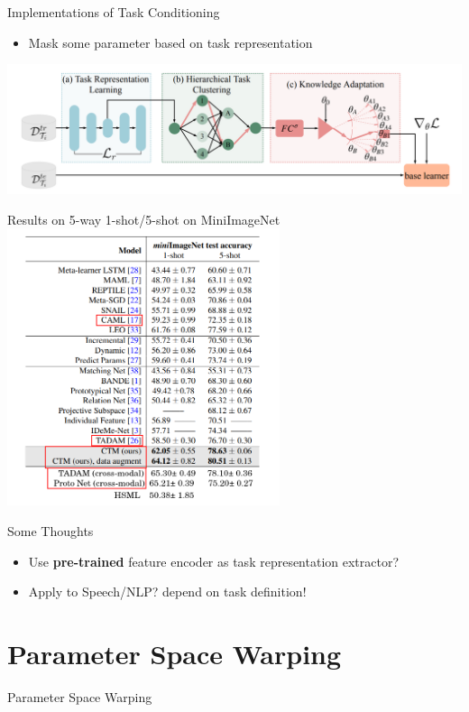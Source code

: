 \documentclass{beamer}
\begin{document}
\begin{frame}{Implementations of Task Conditioning}
  \begin{itemize}
    \item Mask some parameter based on task representation
  \end{itemize}
  \center \includegraphics[width=\textwidth]{fig/hierarchical-meta.png}
\end{frame}

\begin{frame}{Results on 5-way 1-shot/5-shot on MiniImageNet}
  \center \includegraphics[width=0.6\textwidth]{fig/task-conditioning-result.png}
\end{frame}

\begin{frame}{Some Thoughts}
  \begin{itemize}
    \item Use \textbf{pre-trained} feature encoder as task representation extractor?
    \item Apply to Speech/NLP? depend on task definition!
  \end{itemize}
\end{frame}

\section{Parameter Space Warping}
\begin{frame}
  \begin{center}
    \LARGE{Parameter Space Warping}
  \end{center}
\end{frame}
\end{document}
